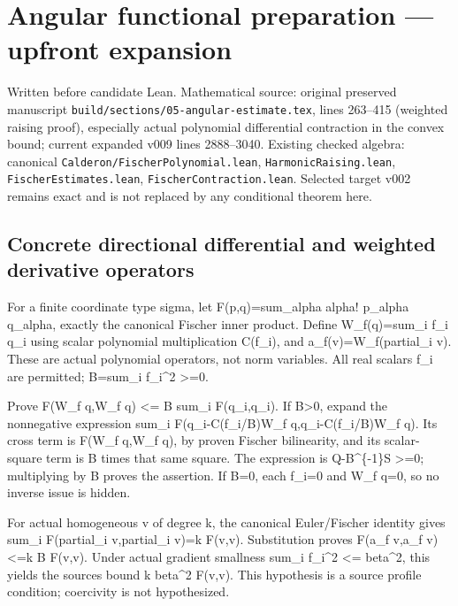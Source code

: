 \documentclass[11pt]{article}
\theoremstyle{definition}
\theoremstyle{remark}
\numberwithin{equation}{section}
\begin{document}
\clearpage
\hypertarget{source-e4785d68ade7-angular-functional-preparation-upfront-expansion}{%
\section{Angular functional preparation --- upfront
expansion}\label{source-e4785d68ade7-angular-functional-preparation-upfront-expansion}}

Written before candidate Lean. Mathematical source: original preserved
manuscript \nolinkurl{build/sections/05-angular-estimate.tex}, lines
263--415 (weighted raising proof), especially actual polynomial
differential contraction in the convex bound; current expanded v009
lines 2888--3040. Existing checked algebra: canonical
\nolinkurl{Calderon/FischerPolynomial.lean}, \nolinkurl{HarmonicRaising.lean},
\nolinkurl{FischerEstimates.lean}, \nolinkurl{FischerContraction.lean}.
Selected target v002 remains exact and is not replaced by any
conditional theorem here.

\hypertarget{source-e4785d68ade7-concrete-directional-differential-and-weighted-derivative-operators}{%
\subsection{Concrete directional differential and weighted derivative
operators}\label{source-e4785d68ade7-concrete-directional-differential-and-weighted-derivative-operators}}

For a finite coordinate type sigma, let F(p,q)=sum\_alpha alpha!
p\_alpha q\_alpha, exactly the canonical Fischer inner product. Define
W\_f(q)=sum\_i f\_i q\_i using scalar polynomial multiplication C(f\_i),
and a\_f(v)=W\_f(partial\_i v). These are actual polynomial operators,
not norm variables. All real scalars f\_i are permitted; B=sum\_i
f\_i\^{}2 \textgreater=0.

Prove F(W\_f q,W\_f q) \textless= B sum\_i F(q\_i,q\_i). If
B\textgreater0, expand the nonnegative expression sum\_i
F(q\_i-C(f\_i/B)W\_f q,q\_i-C(f\_i/B)W\_f q). Its cross term is F(W\_f
q,W\_f q), by proven Fischer bilinearity, and its scalar-square term is
B times that same square. The expression is Q-B\^{}\{-1\}S
\textgreater=0; multiplying by B proves the assertion. If B=0, each
f\_i=0 and W\_f q=0, so no inverse issue is hidden.

For actual homogeneous v of degree k, the canonical Euler/Fischer
identity gives sum\_i F(partial\_i v,partial\_i v)=k F(v,v).
Substitution proves F(a\_f v,a\_f v)\textless=k B F(v,v). Under actual
gradient smallness sum\_i f\_i\^{}2 \textless= beta\^{}2, this yields
the source\textquotesingle s bound k beta\^{}2 F(v,v). This hypothesis
is a source profile condition; coercivity is not hypothesized.
\end{document}
